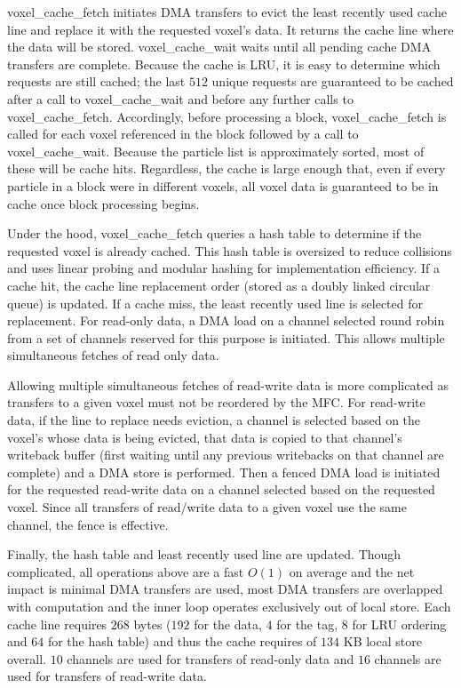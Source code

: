 \documentclass[10pt]{article}
\begin{document}
voxel\_cache\_fetch initiates DMA transfers to evict the least
recently used cache line and replace it with the requested voxel's
data.  It returns the cache line where the data will be stored.
voxel\_cache\_wait waits until all pending cache DMA transfers are
complete.  Because the cache is LRU, it is easy to determine which
requests are still cached; the last $512$ unique requests are
guaranteed to be cached after a call to voxel\_cache\_wait and before
any further calls to voxel\_cache\_fetch.  Accordingly, before
processing a block, voxel\_cache\_fetch is called for each voxel
referenced in the block followed by a call to voxel\_cache\_wait.
Because the particle list is approximately sorted, most of these will
be cache hits.  Regardless, the cache is large enough that, even if
every particle in a block were in different voxels, all voxel data is
guaranteed to be in cache once block processing begins.

Under the hood, voxel\_cache\_fetch queries a hash table to determine
if the requested voxel is already cached.  This hash table is
oversized to reduce collisions and uses linear probing and modular
hashing for implementation efficiency.  If a cache hit, the cache line
replacement order (stored as a doubly linked circular queue) is
updated.  If a cache miss, the least recently used line is selected
for replacement.  For read-only data, a DMA load on a channel selected
round robin from a set of channels reserved for this purpose is
initiated.  This allows multiple simultaneous fetches of read only
data.

Allowing multiple simultaneous fetches of read-write data is more
complicated as transfers to a given voxel must not be reordered by the
MFC.  For read-write data, if the line to replace needs eviction, a
channel is selected based on the voxel's whose data is being evicted,
that data is copied to that channel's writeback buffer (first waiting
until any previous writebacks on that channel are complete) and a DMA
store is performed.  Then a fenced DMA load is initiated for the
requested read-write data on a channel selected based on the requested
voxel.  Since all transfers of read/write data to a given voxel
use the same channel, the fence is effective.

Finally, the hash table and least recently used line are updated.
Though complicated, all operations above are a fast $O(1)$ on average
and the net impact is minimal DMA transfers are used, most DMA
transfers are overlapped with computation and the inner loop operates
exclusively out of local store.  Each cache line requires $268$ bytes
($192$ for the data, $4$ for the tag, $8$ for LRU ordering and $64$
for the hash table) and thus the cache requires of $134$ KB local
store overall.  $10$ channels are used for transfers of read-only data
and $16$ channels are used for transfers of read-write data.
\end{document}
